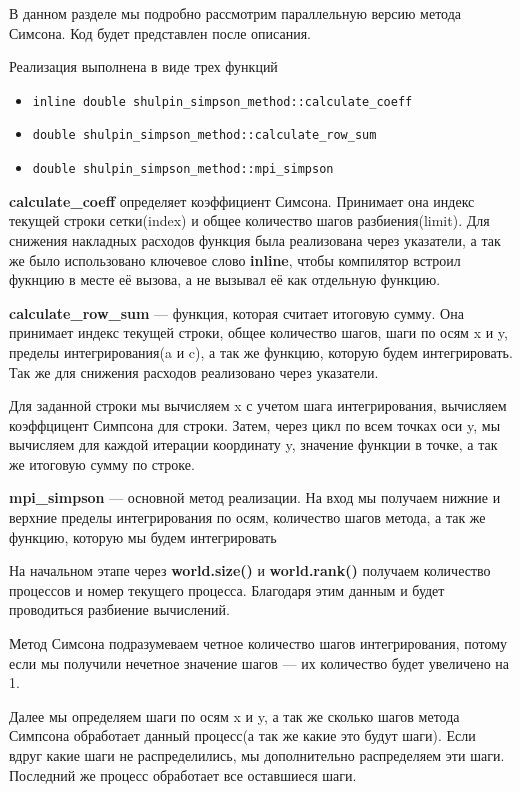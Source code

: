 \documentclass[12pt,a4paper]{article}
\begin{document}
В данном разделе мы подробно рассмотрим параллельную версию метода Симсона. Код будет представлен после описания.

Реализация выполнена в виде трех функций 
\begin{itemize}
    \item \texttt{inline double shulpin\_simpson\_method::calculate\_coeff}
    \item \texttt{double shulpin\_simpson\_method::calculate\_row\_sum}
    \item \texttt{double shulpin\_simpson\_method::mpi\_simpson}
\end{itemize}

\textbf{calculate\_coeff} определяет коэффициент Симсона. Принимает она индекс текущей строки сетки(index) и общее количество шагов разбиения(limit). Для снижения накладных расходов функция была реализована через указатели, а так же было использовано ключевое слово \textbf{inline}, чтобы компилятор встроил фукнцию в месте её вызова, а не вызывал её как отдельную функцию.

\textbf{calculate\_row\_sum} --- функция, которая считает итоговую сумму. Она принимает индекс текущей строки, общее количество шагов, шаги по осям x и y, пределы интегрирования(a и c), а так же функцию, которую будем интегрировать. Так же для снижения расходов реализовано через указатели.

Для заданной строки мы вычисляем x с учетом шага интегрирования, вычисляем коэффцицент Симпсона для строки. Затем, через цикл по всем точках оси y, мы вычисляем для каждой итерации координату y, значение функции в точке, а так же итоговую сумму по строке.

\textbf{mpi\_simpson} --- основной метод реализации. На вход мы получаем нижние и верхние пределы интегрирования по осям, количество шагов метода, а так же функцию, которую мы будем интегрировать 

На начальном этапе через \textbf{world.size()} и \textbf{world.rank()} получаем количество процессов и номер текущего процесса. Благодаря этим данным и будет проводиться разбиение вычислений.

Метод Симсона подразумеваем четное количество шагов интегрирования, потому если мы получили нечетное значение шагов --- их количество будет увеличено на 1.

Далее мы определяем шаги по осям x и y, а так же сколько шагов метода Симпсона обработает данный процесс(а так же какие это будут шаги). Если вдруг какие шаги не распределились, мы дополнительно распределяем эти шаги. Последний же процесс обработает все оставшиеся шаги.
\end{document}
